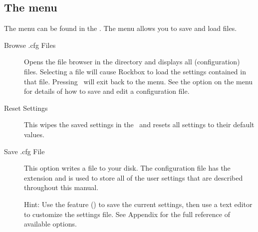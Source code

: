 \subsection{\label{ref:manage_settings_menu}The  
  menu} The  menu can be found in the . The  menu allows you to save and load 
 files.  

\begin{description}
  
\item [Browse .cfg Files]Opens the file browser in the  
  directory and displays all  (configuration) files. Selecting a 
   file will cause Rockbox to load the settings contained in that 
  file. Pressing \ButtonLeft\ will exit back to the 
  menu. See the  option on the 
   menu for details of how to save and edit a 
  configuration file.
  
\item [Reset Settings]This wipes the saved settings in the \dap\ and 
  resets all settings to their default values. 
  

\item [Save .cfg File]This option writes a  file to 
  your \daps{} disk.  The configuration file has the  
  extension and is used to store all of the user settings that are described 
  throughout this manual.
    
  Hint: Use the  feature () to save the current settings, then 
  use a text editor to customize the settings file. See Appendix 
   for the full reference of available 
  options.
  

\end{description}
